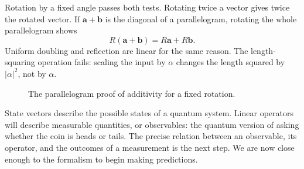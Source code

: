 Rotation by a fixed angle passes both tests. Rotating twice a vector gives
twice the rotated vector. If \(\mathbf a+\mathbf b\) is the diagonal of a
parallelogram, rotating the whole parallelogram shows
\begin{equation}
 R(\mathbf a+\mathbf b)=R\mathbf a+R\mathbf b.
\end{equation}
Uniform doubling and reflection are linear for the same reason. The
length-squaring operation fails: scaling the input by \(\alpha\) changes the
length squared by \(|\alpha|^2\), not by \(\alpha\).

\begin{figure}[tbp]
\centering
{}
\caption{The parallelogram proof of additivity for a fixed rotation.}
\end{figure}

State vectors describe the possible states of a quantum system. Linear
operators will describe measurable quantities, or observables: the quantum
version of asking whether the coin is heads or tails. The precise relation
between an observable, its operator, and the outcomes of a measurement is the
next step. We are now close enough to the formalism to begin making
predictions.
